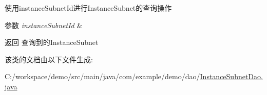 使用instance\+Subnet\+Id进行\+Instance\+Subnet的查询操作 
\begin{DoxyParams}{参数}
{\em instance\+Subnet\+Id} & \\
\hline
\end{DoxyParams}
\begin{DoxyReturn}{返回}
查询到的\+Instance\+Subnet 
\end{DoxyReturn}


该类的文档由以下文件生成\+:\begin{DoxyCompactItemize}
\item 
C\+:/workspace/demo/src/main/java/com/example/demo/dao/\mbox{\hyperlink{_instance_subnet_dao_8java}{Instance\+Subnet\+Dao.\+java}}\end{DoxyCompactItemize}
